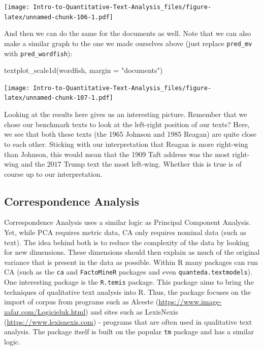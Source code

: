 \documentclass[
]{article}
\newenvironment{Shaded}{\begin{snugshade}}{\end{snugshade}}
\newcommand{\AttributeTok}[1]{\textcolor[rgb]{0.77,0.63,0.00}{#1}}
\newcommand{\FunctionTok}[1]{\textcolor[rgb]{0.00,0.00,0.00}{#1}}
\newcommand{\NormalTok}[1]{#1}
\newcommand{\StringTok}[1]{\textcolor[rgb]{0.31,0.60,0.02}{#1}}
\begin{document}
\texttt{[image: Intro-to-Quantitative-Text-Analysis\_files/figure-latex/unnamed-chunk-106-1.pdf]}

And then we can do the same for the documents as well. Note that we can also make a similar graph to the one we made ourselves above (just replace \texttt{pred\_mv} with \texttt{pred\_wordfish}):

\begin{Shaded}
\begin{Highlighting}[]
\FunctionTok{textplot\_scale1d}\NormalTok{(wordfish, }\AttributeTok{margin =} \StringTok{"documents"}\NormalTok{)}
\end{Highlighting}
\end{Shaded}

\texttt{[image: Intro-to-Quantitative-Text-Analysis\_files/figure-latex/unnamed-chunk-107-1.pdf]}

Looking at the results here gives us an interesting picture. Remember that we chose our benchmark texts to look at the left-right position of our texts? Here, we see that both these texts (the 1965 Johnson and 1985 Reagan) are quite close to each other. Sticking with our interpretation that Reagan is more right-wing than Johnson, this would mean that the 1909 Taft address was the most right-wing and the 2017 Trump text the most left-wing. Whether this is true is of course up to our interpretation.

\hypertarget{correspondence-analysis}{%
\subsection{Correspondence Analysis}\label{correspondence-analysis}}

Correspondence Analysis uses a similar logic as Principal Component Analysis. Yet, while PCA requires metric data, CA only requires nominal data (such as text). The idea behind both is to reduce the complexity of the data by looking for new dimensions. These dimensions should then explain as much of the original variance that is present in the data as possible. Within R many packages can run CA (such as the \texttt{ca} and \texttt{FactoMineR} packages and even \texttt{quanteda.textmodels}). One interesting package is the \texttt{R.temis} package. This package aims to bring the techniques of qualitative text analysis into R. Thus, the package focuses on the import of corpus from programs such as Alceste (\url{https://www.image-zafar.com/Logicieluk.html}) and sites such as LexisNexis (\url{https://www.lexisnexis.com}) - programs that are often used in qualitative text analysis. The package itself is built on the popular \texttt{tm} package and has a similar logic.
\end{document}
